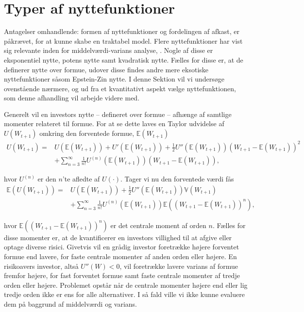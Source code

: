 \documentclass[
  a4paper,
  oneside]{memoir}
\begin{document}
\hypertarget{typnyt}{%
\section{Typer af nyttefunktioner}\label{typnyt}}

Antagelser omhandlende: formen af nyttefunktioner og fordelingen af afkast, er påkrævet, for at kunne skabe en traktabel model. Flere nyttefunktioner har vist sig relevante inden for middelværdi-varians analyse, \citep{CampVic2003}. Nogle af disse er eksponentiel nytte, potens nytte samt kvadratisk nytte. Fælles for disse er, at de definerer nytte over formue, udover disse findes andre mere eksotiske nyttefunktioner såsom Epstein-Zin nytte. I denne Sektion vil vi undersøge ovenstående nærmere, og ud fra et kvantitativt aspekt vælge nyttefunktionen, som denne afhandling vil arbejde videre med.

Generelt vil en investors nytte -- defineret over formue -- afhænge af samtlige momenter relateret til formue. For at se dette laves en Taylor udvidelse af \(U(W_{t+1})\) omkring den forventede formue, \(\mathbb{E}(W_{t+1})\)
\begin{align*}
U\left(W_{t+1}\right)=&U\left(\mathbb{E}\left(W_{t+1}\right)\right)+U'\left(\mathbb{E}\left(W_{t+1}\right)\right)+\frac{1}{2}U''\left(\mathbb{E}\left(W_{t+1}\right)\right)\left(W_{t+1}-\mathbb{E}\left(W_{t+1}\right)\right)^2\\
&+\sum_{n=3}^\infty \frac{1}{n!}U^{\left(n\right)}\left(\mathbb{E}\left(W_{t+1}\right)\right)\left(W_{t+1}-\mathbb{E}\left(W_{t+1}\right)\right),
\end{align*}

hvor \(U^{(n)}\) er den \(n\)'te afledte af \(U(\cdot)\). Tager vi nu den forventede værdi fås
\begin{align*}
\mathbb{E}\left(U\left(W_{t+1}\right)\right)=&U\left(\mathbb{E}\left(W_{t+1}\right)\right)+\frac{1}{2}U''\left(\mathbb{E}\left(W_{t+1}\right)\right)\mathbb{V}\left(W_{t+1}\right)\\
&+\sum_{n=3}^\infty \frac{1}{n!} U^{\left(n\right)}\left(\mathbb{E}\left(W_{t+1}\right)\right)\mathbb{E}\left(\left(W_{t+1}-\mathbb{E}\left(W_{t+1}\right)\right)^n\right),
\end{align*}

hvor \(\mathbb{E}((W_{t+1}-\mathbb{E}(W_{t+1}))^n)\) er det centrale moment af orden \(n\). Fælles for disse momenter er, at de kvantificerer en investors villighed til at afgive eller optage diverse risici. Givetvis vil en grådig investor foretrække højere forventet formue end lavere, for faste centrale momenter af anden orden eller højere. En risikoavers investor, altså \(U''(W)<0\), vil foretrække lavere varians af formue fremfor højere, for fast forventet formue samt faste centrale momenter af tredje orden eller højere. Problemet opstår når de centrale momenter højere end eller lig tredje orden ikke er ens for alle alternativer. I så fald ville vi ikke kunne evaluere dem på baggrund af middelværdi og varians.
\end{document}
